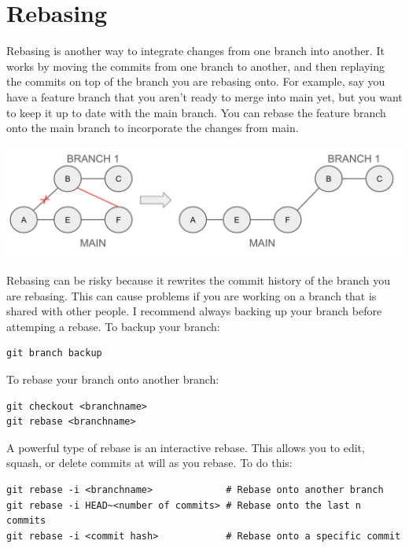 \documentclass[fleqn]{article}
\begin{document}
\section*{Rebasing}

Rebasing is another way to integrate changes from one branch into another.
It works by moving the commits from one branch to another, and then replaying
the commits on top of the branch you are rebasing onto. For example, say you
have a feature branch that you aren't ready to merge into main yet, but you
want to keep it up to date with the main branch. You can rebase the feature
branch onto the main branch to incorporate the changes from main.

\begin{center}
    \includegraphics[scale=0.4]{rebase.png}
\end{center}

Rebasing can be risky because it rewrites the commit history of the branch you
are rebasing. This can cause problems if you are working on a branch that is
shared with other people. I recommend always backing up your branch before 
attemping a rebase. To backup your branch:

\begin{lstlisting}
git branch backup
\end{lstlisting}

To rebase your branch onto another branch:

\begin{lstlisting}
git checkout <branchname>
git rebase <branchname>
\end{lstlisting}

A powerful type of rebase is an interactive rebase. This allows you to edit,
squash, or delete commits at will as you rebase. To do this:

\begin{lstlisting}
git rebase -i <branchname>             # Rebase onto another branch
git rebase -i HEAD~<number of commits> # Rebase onto the last n commits
git rebase -i <commit hash>            # Rebase onto a specific commit
\end{lstlisting}
\end{document}
